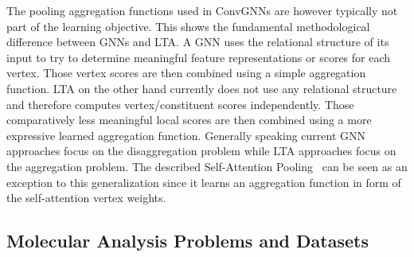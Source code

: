 \documentclass[12pt]{scrartcl}
\begin{document}
The pooling aggregation functions used in ConvGNNs are however typically not part of the learning objective.
This shows the fundamental methodological difference between GNNs and LTA.\@
A GNN uses the relational structure of its input to try to determine meaningful feature representations or scores for each vertex.
Those vertex scores are then combined using a simple aggregation function.
LTA on the other hand currently does not use any relational structure and therefore computes vertex/constituent scores independently.
Those comparatively less meaningful local scores are then combined using a more expressive learned aggregation function.
Generally speaking current GNN approaches focus on the disaggregation problem while LTA approaches focus on the aggregation problem.
The described Self-Attention Pooling~\cite{Lee2019} can be seen as an exception to this generalization since it learns an aggregation function in form of the self-attention vertex weights.

\subsection{Molecular Analysis Problems and Datasets}%
\label{sec:related-work:tox}
\end{document}
